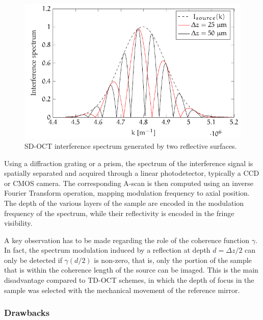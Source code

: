 \begin{figure}[hbt]
	\myfloatalign
	\includegraphics[width=0.85\linewidth]{gfx/tikz/fdoct-spectrum}
	\caption{\ac{SD-OCT} interference spectrum generated by two reflective surfaces.}\label{fig:fdoct-spectrum}
\end{figure}

Using a diffraction grating or a prism, the spectrum of the interference signal is spatially separated and acquired through a linear photodetector, typically a \ac{CCD} or \ac{CMOS} camera. The corresponding A-scan is then computed using an inverse Fourier Transform operation, mapping modulation frequency to axial position. The depth of the various layers of the sample are encoded in the modulation frequency of the spectrum, while their reflectivity is encoded in the fringe visibility. 

A key observation has to be made regarding the role of the coherence function $\gamma$. In fact, the spectrum modulation induced by a reflection at depth $d=\Delta z /2$ can only be detected if $\gamma(d/2)$ is non-zero, that is, only the portion of the sample that is within the coherence length of the source can be imaged. This is the main disadvantage compared to \ac{TD-OCT} schemes, in which the depth of focus in the sample was selected with the mechanical movement of the reference mirror.


\subsubsection{Drawbacks}


